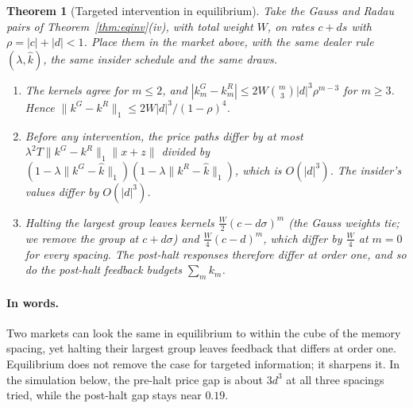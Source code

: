 \documentclass[12pt]{article}
\newtheorem{theorem}{Theorem}[section]
\theoremstyle{definition}
\theoremstyle{remark}
\begin{document}
\begin{theorem}[Targeted intervention in equilibrium]\label{thm:eqhalt}
Take the Gauss and Radau pairs of Theorem~\ref{thm:eqinv}(iv), with total weight $W$, on rates $c+ds$ with $\rho=|c|+|d|<1$. Place them in the market above, with the same dealer rule $(\lambda,\hat k)$, the same insider schedule and the same draws.
\begin{enumerate}[label=(\roman*),itemsep=1pt]
\item The kernels agree for $m\le2$, and $|k^G_m-k^R_m|\le2W\binom m3|d|^3\rho^{m-3}$ for $m\ge3$. Hence $\|k^G-k^R\|_1\le2W|d|^3/(1-\rho)^4$.
\item Before any intervention, the price paths differ by at most $\lambda^2T\|k^G-k^R\|_1\|x+z\|$ divided by $(1-\lambda\|k^G-\hat k\|_1)(1-\lambda\|k^R-\hat k\|_1)$, which is $O(|d|^3)$. The insider's values differ by $O(|d|^3)$.
\item Halting the largest group leaves kernels $\tfrac W2(c-d\sigma)^m$ (the Gauss weights tie; we remove the group at $c+d\sigma$) and $\tfrac W4(c-d)^m$, which differ by $\tfrac W4$ at $m=0$ for every spacing. The post-halt responses therefore differ at order one, and so do the post-halt feedback budgets $\sum_mk_m$.
\end{enumerate}
\end{theorem}

\paragraph{In words.} Two markets can look the same in equilibrium to within the cube of the memory spacing, yet halting their largest group leaves feedback that differs at order one. Equilibrium does not remove the case for targeted information; it sharpens it. In the simulation below, the pre-halt price gap is about $3d^3$ at all three spacings tried, while the post-halt gap stays near $0.19$.
\end{document}
